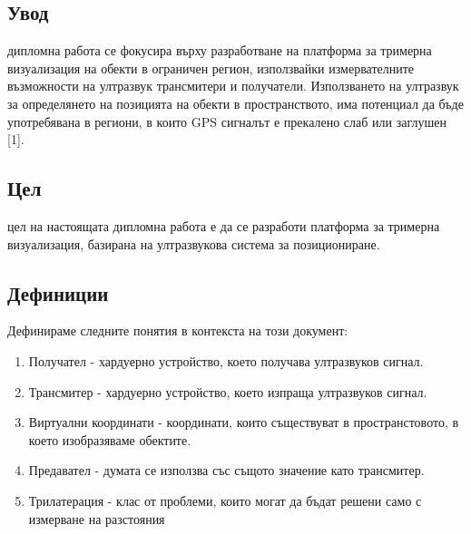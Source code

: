 \subsection{Увод}
 дипломна работа се фокусира върху разработване на платформа за тримерна визуализация на обекти в ограничен регион, използвайки измервателните възможности на ултразвук трансмитери и получатели. Използването на ултразвук за определянето на позицията на обекти в пространството, има потенциал да бъде употребявана в региони, в които GPS сигналът е прекалено слаб или заглушен [1].

\subsection{Цел}
 цел на настоящата дипломна работа е да се разработи платформа за тримерна визуализация, базирана на ултразвукова система за позициониране.

\subsection{Дефиниции}
Дефинираме следните понятия в контекста на този документ:
\begin{enumerate}
    \item Получател - хардуерно устройство, което получава ултразвуков сигнал.
    \item Трансмитер - хардуерно устройство, което изпраща ултразвуков сигнал.
    \item Виртуални координати - координати, които съществуват в пространстовото, в което изобразяваме обектите.
    \item Предавател - думата се използва със същото значение като трансмитер.
    \item Трилатерация - клас от проблеми, които могат да бъдат решени само с измерване на разстояния \cite{murphy}
\end{enumerate}

